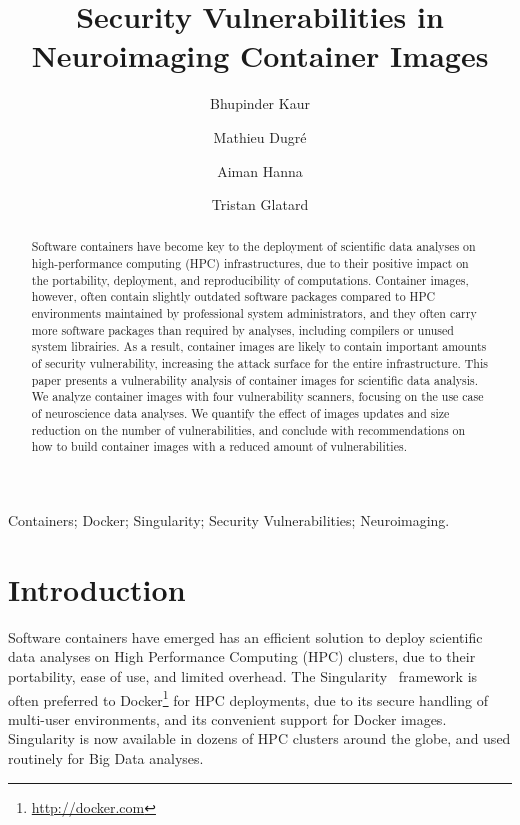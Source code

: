 \documentclass[a4paper,num-refs]{oup-contemporary}
\title{Security Vulnerabilities in Neuroimaging Container Images}
\begin{document}
\author[1]{Bhupinder Kaur}
\author[1]{Mathieu Dugr\'e}
\author[1]{Aiman Hanna}
\author[1]{Tristan Glatard}


\maketitle

\begin{abstract}
Software containers have become key to the deployment of
scientific data analyses on high-performance computing (HPC)
infrastructures, due to their positive impact on the portability, deployment, and
reproducibility of computations. Container images, however, often contain slightly outdated
software packages compared to HPC environments maintained by professional
 system administrators, and they often carry more
software packages than required by analyses, including compilers or unused
system librairies. As a result, container images are likely to contain
important amounts of security vulnerability, increasing the attack surface
for the entire infrastructure. This paper presents a vulnerability analysis
of container images for scientific data analysis. We analyze container
images with four vulnerability scanners, focusing on the use case of
neuroscience data analyses. We quantify the effect of images updates and
size reduction on the number of vulnerabilities, and conclude with
recommendations on how to build container images with a reduced amount of
vulnerabilities.


\end{abstract}

\begin{keywords}
Containers; Docker; Singularity; Security Vulnerabilities; Neuroimaging.
\end{keywords}

\section{Introduction}

Software containers have emerged has an efficient solution to deploy
scientific data analyses on High Performance Computing (HPC) clusters, due
to their portability, ease of use, and limited overhead. The
Singularity~\cite{kurtzer2017singularity} framework is often preferred to
Docker\footnote{\url{http://docker.com}} for HPC deployments, due to its
secure handling of multi-user environments, and its convenient support for
Docker images. Singularity is now available in dozens of HPC
clusters around the globe, and used routinely for Big Data analyses.
\end{document}
